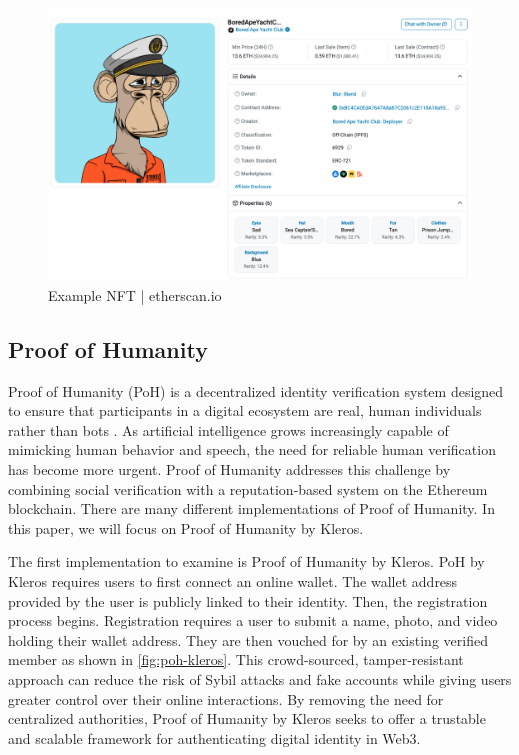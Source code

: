 \documentclass[conference]{IEEEtran}
\begin{document}
\begin{figure}[h!]
    \centering
    \includegraphics[width=0.9\linewidth]{nft-example.png}
    \caption{Example NFT | etherscan.io}
    \label{fig:nft-exp}
\end{figure}

\subsection{Proof of Humanity}
Proof of Humanity (PoH) is a decentralized identity verification system designed to ensure that participants in a digital ecosystem are real, human individuals rather than bots \cite{what-is-poh}. As artificial intelligence grows increasingly capable of mimicking human behavior and speech, the need for reliable human verification has become more urgent. Proof of Humanity addresses this challenge by combining social verification with a reputation-based system on the Ethereum blockchain. There are many different implementations of Proof of Humanity. In this paper, we will focus on Proof of Humanity by Kleros.

The first implementation to examine is Proof of Humanity by Kleros. PoH by Kleros requires users to first connect an online wallet. The wallet address provided by the user is publicly linked to their identity. Then, the registration process begins. Registration requires a user to submit a name, photo, and video holding their wallet address. They are then vouched for by an existing verified member as shown in \ref{fig:poh-kleros}. This crowd-sourced, tamper-resistant approach can reduce the risk of Sybil attacks and fake accounts while giving users greater control over their online interactions. By removing the need for centralized authorities, Proof of Humanity by Kleros seeks to offer a trustable and scalable framework for authenticating digital identity in Web3.
\end{document}
